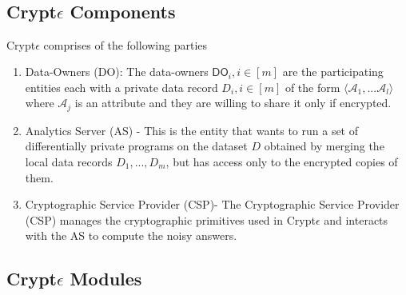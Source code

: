 \\ 
\\\\\\
\subsection{Crypt$\epsilon$ Components}
Crypt$\epsilon$ comprises of the following parties\begin{enumerate}
 \item Data-Owners (\textsf{DO}): The data-owners $\textsf{DO}_i, i \in [m]$ are the participating entities each with a
private data record $D_i, i \in [m]$ of the form $\langle \mathcal{A}_1,...\mathcal{A}_l\rangle$ where $\mathcal{A}_j$ is an attribute and they are willing to share it only if encrypted.    \item Analytics Server (\textsf{AS}) - This is the entity that wants to run a set of differentially private programs on the dataset $D$ obtained by merging the local data records $D_1, ... , D_m$, but has
access only to the encrypted copies of them. 
\item Cryptographic Service Provider (\textsf{CSP})-
 The Cryptographic Service Provider (\textsf{CSP}) manages the cryptographic primitives used in Crypt$\epsilon$ and interacts with the \textsf{AS} to compute the
noisy answers. 
\end{enumerate}
\subsection{Crypt$\epsilon$ Modules}
